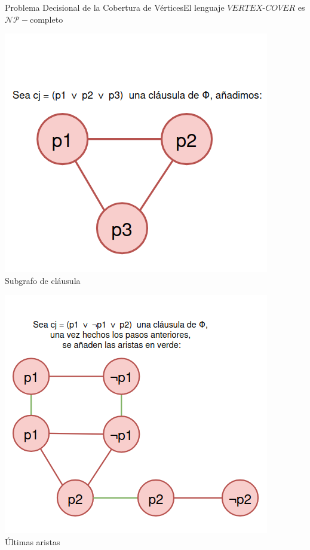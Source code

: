 \documentclass[10pt, envcountsect, presentation, aspectratio=169]{beamer}
\begin{document}
\begin{frame}{Problema Decisional de la Cobertura de Vértices}{El lenguaje $VERTEX\text{-}COVER$ es $\mathcal{NP}-$completo}
\begin{minipage}{0.32\textwidth}
    \end{minipage}
    \hfill
    \begin{minipage}{0.32\textwidth}
        \centering
        \includegraphics[width=\linewidth]{images/image2.png}
        \\\small Subgrafo de cláusula
    \end{minipage}
    \hfill
    \begin{minipage}{0.32\textwidth}
        \centering
        \includegraphics[width=\linewidth]{images/image3.png}
        \\\small Últimas aristas
    \end{minipage}
\end{frame}
\end{document}
